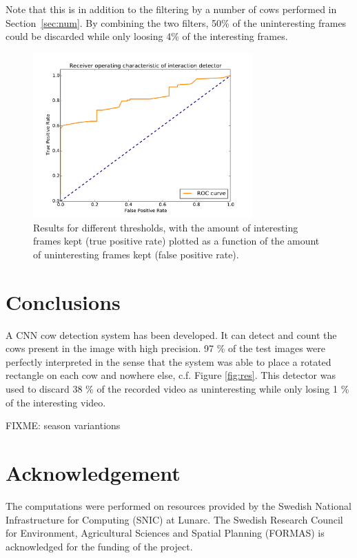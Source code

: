 \documentclass{IET}
\begin{document}
Note that this is in addition to the filtering by a number of cows performed in Section~\ref{sec:num}. By combining the two filters, 50\% of the uninteresting frames could be discarded while only loosing 4\% of the interesting frames.

\begin{figure}[tb]
\begin{center}
  \includegraphics[width=0.75\textwidth]{roc.pdf}
\end{center}
  \caption{Results for different thresholds, with the amount of interesting frames kept (true positive rate) plotted as a function of the amount of uninteresting frames kept (false positive rate).}
  \label{fig:roc}
\end{figure}


\section{Conclusions}
A CNN cow detection system has been developed. It can detect and count the cows present in the image with high precision. 97 \% of the test images were perfectly interpreted in the sense that the system was able to place a rotated rectangle on each cow and nowhere else, c.f. Figure \ref{fig:res}. This detector was used to discard 38 \% of the recorded video as uninteresting while only losing 1 \% of the interesting video.

FIXME: season variantions

\section{Acknowledgement}
The computations were performed on resources provided by the Swedish National Infrastructure for Computing (SNIC) at Lunarc. The Swedish Research Council for Environment, Agricultural Sciences and 
Spatial Planning (FORMAS) is acknowledged 
for the funding of the project.




{\parindent0pt
\parskip8pt

}
\end{document}
